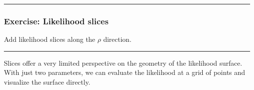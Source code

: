 \documentclass[]{article}
\newenvironment{Shaded}{\begin{snugshade}}{\end{snugshade}}
\newcommand{\KeywordTok}[1]{\textcolor[rgb]{0.13,0.29,0.53}{\textbf{#1}}}
\newcommand{\DataTypeTok}[1]{\textcolor[rgb]{0.13,0.29,0.53}{#1}}
\newcommand{\DecValTok}[1]{\textcolor[rgb]{0.00,0.00,0.81}{#1}}
\newcommand{\FloatTok}[1]{\textcolor[rgb]{0.00,0.00,0.81}{#1}}
\newcommand{\StringTok}[1]{\textcolor[rgb]{0.31,0.60,0.02}{#1}}
\newcommand{\OtherTok}[1]{\textcolor[rgb]{0.56,0.35,0.01}{#1}}
\newcommand{\OperatorTok}[1]{\textcolor[rgb]{0.81,0.36,0.00}{\textbf{#1}}}
\newcommand{\NormalTok}[1]{#1}
\begin{document}
\begin{center}\rule{0.5\linewidth}{\linethickness}\end{center}

\subsubsection{Exercise: Likelihood
slices}\label{exercise-likelihood-slices}

Add likelihood slices along the \(\rho\) direction.

\begin{center}\rule{0.5\linewidth}{\linethickness}\end{center}

Slices offer a very limited perspective on the geometry of the
likelihood surface. With just two parameters, we can evaluate the
likelihood at a grid of points and visualize the surface directly.

\begin{Shaded}
\end{Shaded}
\end{document}
